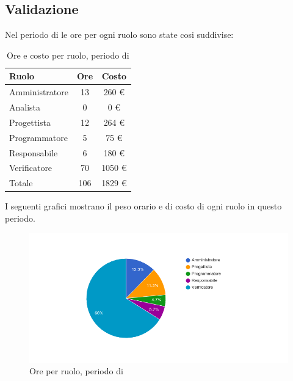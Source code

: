 \subsection{Validazione}
Nel periodo di  le ore per ogni ruolo sono state cosi suddivise:

\begin{table}[H]
	\centering
	\begin{tabular}{ l c c }
		\textbf{Ruolo} & \textbf{Ore} & \textbf{Costo} \\
		\hline
		Amministratore & 13 & 260 \euro{} \\
		Analista & 0 & 0 \euro{} \\
		Progettista & 12 & 264 \euro{} \\
		Programmatore & 5 & 75 \euro{} \\
		Responsabile & 6 & 180 \euro{} \\
		Verificatore & 70 & 1050 \euro{} \\
		\hline
		Totale & 106 & 1829 \euro{} \\
		\hline
	\end{tabular}
	\caption{Ore e costo per ruolo, periodo di }
\end{table}

I seguenti grafici mostrano il peso orario e di costo di ogni ruolo in questo periodo.

\begin{figure}[H]
  \begin{center}
    \includegraphics[width=15cm]{res/img/prospettoEconomico/orePerRuoloValidazione.png}
  \caption{Ore per ruolo, periodo di }
  \end{center} 
\end{figure}  

